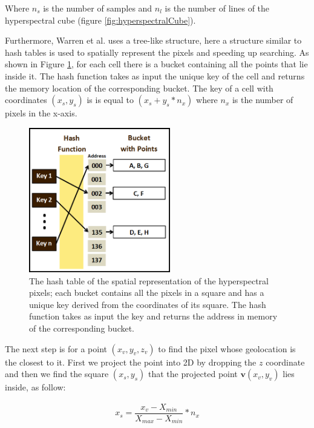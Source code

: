 \documentclass{subfiles}
\begin{document}
	\par Where $n_s$ is the number of samples and $n_l$ is the number of lines of the hyperspectral cube (figure \ref{fig:hyperspectralCube}).
	
	\par Furthermore, Warren et al. \cite{Warren2014} uses a tree-like structure, here a structure similar to hash tables is used to spatially represent the pixels and speeding up searching. As shown in Figure \ref{fig:HashTable}, for each cell there is a bucket containing all the points that lie inside it. The hash function takes as input the unique key of the cell and returns the memory location of the corresponding bucket. The key of a cell with coordinates $(x_s,y_s)$ is is equal to $(x_s + y_s *n_x)$ where $n_x$ is the number of pixels in the x-axis.
	
	 \begin{figure} [h!]
	 	\centering
	 	\includegraphics[width=0.55\textwidth]{img/HashTable}
	 	\caption[Hash Table]{The hash table of the spatial representation of the hyperspectral pixels; each bucket contains all the pixels in a square and has a unique key derived from the coordinates of its square. The hash function takes as input the key and returns the address in memory of the corresponding bucket. }
	 	\label{fig:HashTable}
	 \end{figure}
	
	\par The next step is for a point $(x_v, y_v, z_v)$ to find the pixel whose geolocation is the closest to it. First we project the point into 2D by dropping the $z$ coordinate and then we find the square $(x_s , y_s )$ that the projected point $\mathbf{v}(x_v , y_v)$ lies inside, as follow: 
	
    \begin{eqnarray}
	    x_s = \dfrac{x_v-X_{min}}{X_{max}-X_{min}} * n_x
    \end{eqnarray}
	
\end{document}
